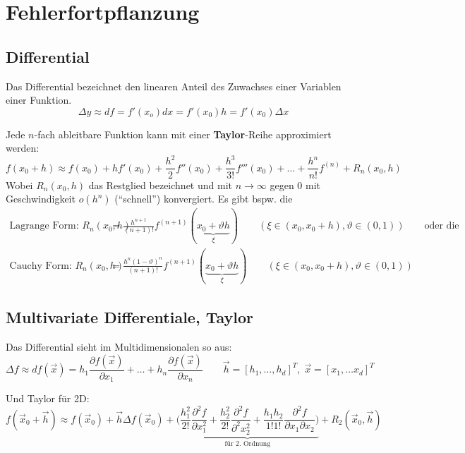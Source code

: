 \section{Fehlerfortpflanzung}

\subsection{Differential}
  Das Differential bezeichnet den linearen Anteil des Zuwachses einer Variablen einer Funktion.
  $$\Delta y \approx df = f'(x_o) dx = f'(x_0) h = f'(x_0) \Delta x$$
  
  Jede $n$-fach ableitbare Funktion kann mit einer \textbf{Taylor}-Reihe approximiert werden:
  $$f(x_0+h) \approx f(x_0) + h f'(x_0) + \frac{h^2}{2} f''(x_0) + \frac{h^3}{3!} f'''(x_0) + 
  \ldots + \frac{h^n}{n!} f^{(n)} + R_n(x_0,h)$$
  Wobei $R_n(x_0,h)$ das Restglied bezeichnet und mit $n \rightarrow \infty$ gegen $0$ mit 
  Geschwindigkeit $o(h^n)$ ("`schnell"') konvergiert. Es gibt bspw. die 
  \begin{align}
    \text{Lagrange Form: } R_n(x_0,h) &= \frac{h^{n+1}}{(n+1)!} f^{(n+1)}(\underbrace{x_0 + \vartheta h}_{\xi})
    \qquad (\xi \in (x_0, x_0+h), \vartheta \in (0,1)) \qquad \text{oder die }\\
    \text{Cauchy Form: } R_n(x_0,h) &= \frac{h^n(1-\vartheta)^n}{(n+1)!} f^{(n+1)}(\underbrace{x_0 + \vartheta h}_{\xi})
    \qquad (\xi \in (x_0, x_0+h), \vartheta \in (0,1))
  \end{align}
  
  
   
\subsection{Multivariate Differentiale, Taylor}
  Das Differential sieht im Multidimensionalen so aus:
  $$\Delta f \approx df(\vec{x}) = h_1 \frac{\partial f(\vec{x})}{\partial x_1} + \ldots + 
  h_n \frac{\partial f(\vec{x})}{\partial x_n} \qquad \vec{h} = [h_1, \ldots, h_d]^T, \; \vec{x} = [x_1, \ldots x_d]^T$$

  Und Taylor für 2D:
  $$f(\vec{x}_0 + \vec{h}) \approx f(\vec{x}_0) + \vec{h} \Delta f(\vec{x}_0) +
  \underbrace{\bigg( \frac{h_1^2}{2!} \frac{\partial^2 f}{\partial x_1^2} + \frac{h_2^2}{2!} \frac{\partial^2 f}{\partial^2 x_2^2}
  + \frac{h_1 h_2}{1!1!} \frac{\partial^2 f}{\partial x_1 \partial x_2}\bigg)}_{\text{für 2. Ordnung}} + R_2(\vec{x}_0, \vec{h})$$

